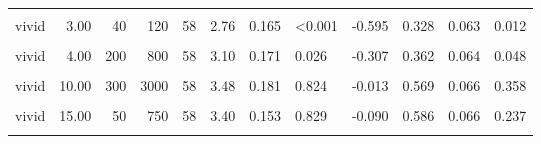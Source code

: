 \documentclass[
]{article}
\begin{document}
\begin{longtable}[t]{lrrrrrrlrrrl}
\hspace{1em}\cellcolor{gray!10}{vivid} & \cellcolor{gray!10}{3.00} & \cellcolor{gray!10}{10} & \cellcolor{gray!10}{30} & \cellcolor{gray!10}{58} & \cellcolor{gray!10}{2.22} & \cellcolor{gray!10}{0.145} & \cellcolor{gray!10}{<0.001} & \cellcolor{gray!10}{-1.167} & \cellcolor{gray!10}{0.138} & \cellcolor{gray!10}{0.046} & \cellcolor{gray!10}{<0.001}\\
\hspace{1em}vivid & 3.00 & 40 & 120 & 58 & 2.76 & 0.165 & <0.001 & -0.595 & 0.328 & 0.063 & 0.012\\
\hspace{1em}\cellcolor{gray!10}{vivid} & \cellcolor{gray!10}{4.00} & \cellcolor{gray!10}{20} & \cellcolor{gray!10}{80} & \cellcolor{gray!10}{58} & \cellcolor{gray!10}{2.71} & \cellcolor{gray!10}{0.159} & \cellcolor{gray!10}{<0.001} & \cellcolor{gray!10}{-0.661} & \cellcolor{gray!10}{0.293} & \cellcolor{gray!10}{0.061} & \cellcolor{gray!10}{0.002}\\
\hspace{1em}vivid & 4.00 & 200 & 800 & 58 & 3.10 & 0.171 & 0.026 & -0.307 & 0.362 & 0.064 & 0.048\\
\hspace{1em}\cellcolor{gray!10}{vivid} & \cellcolor{gray!10}{10.00} & \cellcolor{gray!10}{40} & \cellcolor{gray!10}{400} & \cellcolor{gray!10}{58} & \cellcolor{gray!10}{3.47} & \cellcolor{gray!10}{0.203} & \cellcolor{gray!10}{0.987} & \cellcolor{gray!10}{-0.022} & \cellcolor{gray!10}{0.586} & \cellcolor{gray!10}{0.066} & \cellcolor{gray!10}{0.237}\\
\hspace{1em}vivid & 10.00 & 300 & 3000 & 58 & 3.48 & 0.181 & 0.824 & -0.013 & 0.569 & 0.066 & 0.358\\
\hspace{1em}\cellcolor{gray!10}{vivid} & \cellcolor{gray!10}{15.00} & \cellcolor{gray!10}{20} & \cellcolor{gray!10}{300} & \cellcolor{gray!10}{58} & \cellcolor{gray!10}{3.53} & \cellcolor{gray!10}{0.172} & \cellcolor{gray!10}{0.695} & \cellcolor{gray!10}{0.027} & \cellcolor{gray!10}{0.534} & \cellcolor{gray!10}{0.067} & \cellcolor{gray!10}{0.694}\\
\hspace{1em}vivid & 15.00 & 50 & 750 & 58 & 3.40 & 0.153 & 0.829 & -0.090 & 0.586 & 0.066 & 0.237\\
\hspace{1em}\cellcolor{gray!10}{vivid} & \cellcolor{gray!10}{20.00} & \cellcolor{gray!10}{10} & \cellcolor{gray!10}{200} & \cellcolor{gray!10}{58} & \cellcolor{gray!10}{3.83} & \cellcolor{gray!10}{0.181} & \cellcolor{gray!10}{0.074} & \cellcolor{gray!10}{0.240} & \cellcolor{gray!10}{0.603} & \cellcolor{gray!10}{0.065} & \cellcolor{gray!10}{0.148}\\

\end{longtable}
\end{document}

